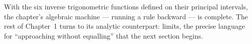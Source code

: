 With the six inverse trigonometric functions defined on their principal intervals, the chapter's algebraic machine --- running a rule backward --- is complete. The rest of Chapter~1 turns to its analytic counterpart: limits, the precise language for ``approaching without equalling'' that the next section begins.

